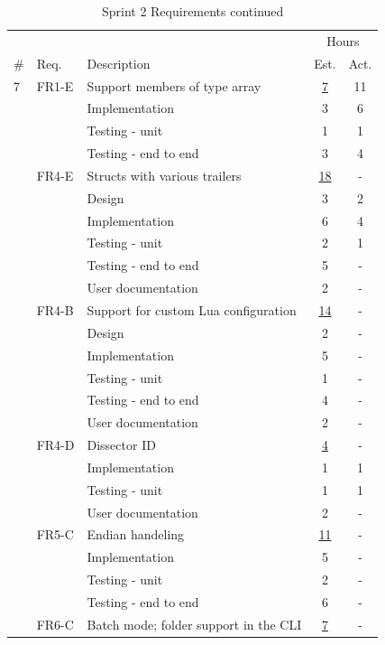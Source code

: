 \begin{table}[!ht] \small \center
\caption{Sprint 2 Requirements continued\label{tab:sprint2req2}}
\begin{tabularx}{\textwidth}{l l X c c}
	\toprule
	& & & \multicolumn{2}{c}{Hours} \\
	\cmidrule(r){4-5}
	\# & Req. & Description & Est. & Act. \\
	\midrule
	7 & FR1-E & Support members of type array & \underline{ 7 } & 11 \\
	   &  & Implementation			   	& 3 & 6\\
	   &  & Testing - unit				   	& 1 & 1\\
	   &  & Testing - end to end			& 3 & 4\\
	\addlinespace
	8 & FR4-E & Structs with various trailers & \underline{ 18 } & - \\
	   &  & Design				   	& 3 & 2\\
	   &  & Implementation			   	& 6 & 4\\
	   &  & Testing - unit				   	& 2 & 1\\
	   &  & Testing - end to end			& 5 & -\\
	   &  & User documentation		   	& 2 & -\\
	\addlinespace
	9 & FR4-B & Support for custom Lua configuration & \underline{ 14 } & - \\
	   &  & Design				   	& 2 & -\\
	   &  & Implementation			   	& 5 & -\\
	   &  & Testing - unit				   	& 1 & -\\
	   &  & Testing - end to end			& 4 & -\\
	   &  & User documentation		   	& 2 & -\\
	\addlinespace
	10 & FR4-D & Dissector ID & \underline{ 4 } & - \\
	   &  & Implementation			   	& 1 & 1\\
	   &  & Testing - unit				   	& 1 & 1\\
	   &  & User documentation 			& 2 & -\\
	\addlinespace
	11 & FR5-C & Endian handeling & \underline{ 11 } & - \\
	   &  & Implementation			   	& 5 & -\\
	   &  & Testing - unit				   	& 2 & -\\
	   &  & Testing - end to end			& 6 & -\\
	\addlinespace
	12 & FR6-C & Batch mode; folder support in the CLI & \underline{ 7 } & - \\

\end{tabularx}
\end{table}
